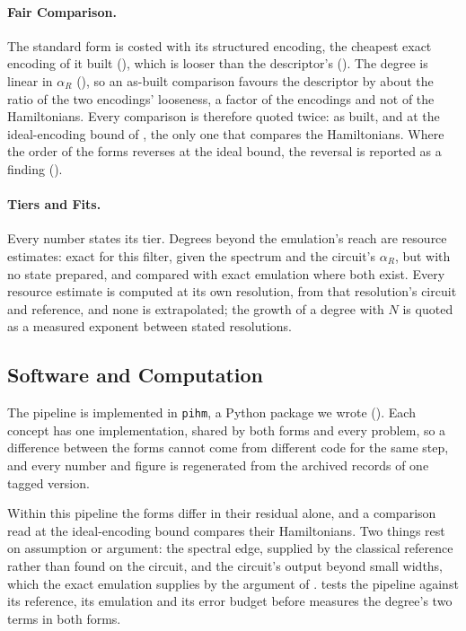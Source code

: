 \paragraph{Fair Comparison.} The standard form is costed with its structured encoding, the cheapest exact encoding of it built (), which is looser than the descriptor's (). The degree is linear in $\alpha_R$ (), so an as-built comparison favours the descriptor by about the ratio of the two encodings' looseness, a factor of the encodings and not of the Hamiltonians. Every comparison is therefore quoted twice: as built, and at the ideal-encoding bound of , the only one that compares the Hamiltonians. Where the order of the forms reverses at the ideal bound, the reversal is reported as a finding ().

\paragraph{Tiers and Fits.} Every number states its tier. Degrees beyond the emulation's reach are resource estimates: exact for this filter, given the spectrum and the circuit's $\alpha_R$, but with no state prepared, and compared with exact emulation where both exist. Every resource estimate is computed at its own resolution, from that resolution's circuit and reference, and none is extrapolated; the growth of a degree with $N$ is quoted as a measured exponent between stated resolutions.

\subsection{Software and Computation}
\label{sec:pipeline-software}

The pipeline is implemented in \texttt{pihm}, a Python package we wrote (). Each concept has one implementation, shared by both forms and every problem, so a difference between the forms cannot come from different code for the same step, and every number and figure is regenerated from the archived records of one tagged version.

Within this pipeline the forms differ in their residual alone, and a comparison read at the ideal-encoding bound compares their Hamiltonians. Two things rest on assumption or argument: the spectral edge, supplied by the classical reference rather than found on the circuit, and the circuit's output beyond small widths, which the exact emulation supplies by the argument of .  tests the pipeline against its reference, its emulation and its error budget before  measures the degree's two terms in both forms.
